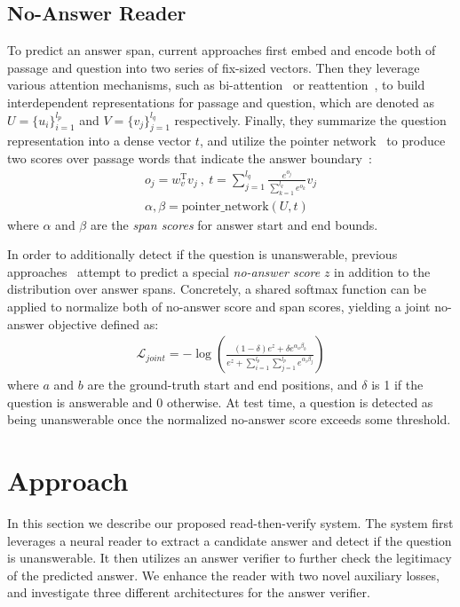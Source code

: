 \documentclass[letterpaper]{article} \usepackage{aaai19}  \usepackage{times}  \usepackage{helvet}  \usepackage{courier}  \usepackage{url}  \usepackage{graphicx}  \usepackage{pbox}
\begin{document}
\subsection{No-Answer Reader}
To predict an answer span, current approaches first embed and encode both of passage and question into two series of fix-sized vectors. Then they leverage various attention mechanisms, such as bi-attention~\cite{Seo17} or reattention~\cite{Hu17}, to build interdependent representations for passage and question, which are denoted as $U=\{u_i\}_{i=1}^{l_p}$ and $V=\{v_j\}_{j=1}^{l_q}$ respectively.
Finally, they summarize the question representation into a dense vector $t$, and utilize the pointer network~\cite{Vinyals15} to produce two scores over passage words that indicate the answer boundary~\cite{Wang17b}:
\begin{gather}
	o_{j} = w_v^ \mathrm{ T } v_j  \ , \
	t=\sum_{j=1}^{l_q} \frac{e^{o_{j}}}{\sum_{k=1}^{l_q} e^{o_{k}}} v_j \nonumber \\
    \alpha, \beta = \mathrm{pointer\_network}(U, t)	\nonumber
\end{gather}
where $\alpha$ and $\beta$ are the \emph{span scores} for answer start and end bounds.

In order to additionally detect if the question is unanswerable, previous approaches~\cite{Levy17,Clark18,kundu2018nil} attempt to predict a special \emph{no-answer score} $z$ in addition to the distribution over answer spans.
Concretely, a shared softmax function can be applied to normalize both of no-answer score and span scores, yielding a joint no-answer objective defined as:
\begin{eqnarray} 
	\mathcal{L}_{joint} = - \log \left( \frac{(1 - \delta)e^z + \delta e^{\alpha_a \beta_b} }{e^z + \sum_{i=1}^{l_p} \sum_{j=1}^{l_p} e^{\alpha_i \beta_j}} \right)	\nonumber
\end{eqnarray}
where $a$ and $b$ are the ground-truth start and end positions, and $\delta$ is 1 if the question is answerable and 0 otherwise.
At test time, a question is detected as being unanswerable once the normalized no-answer score exceeds some threshold.
 \section{Approach}
In this section we describe our proposed read-then-verify system. 
The system first leverages a neural reader to extract a candidate answer and detect if the question is unanswerable.
It then utilizes an answer verifier to further check the legitimacy of the predicted answer.
We enhance the reader with two novel auxiliary losses, and investigate three different architectures for the answer verifier.
\end{document}
